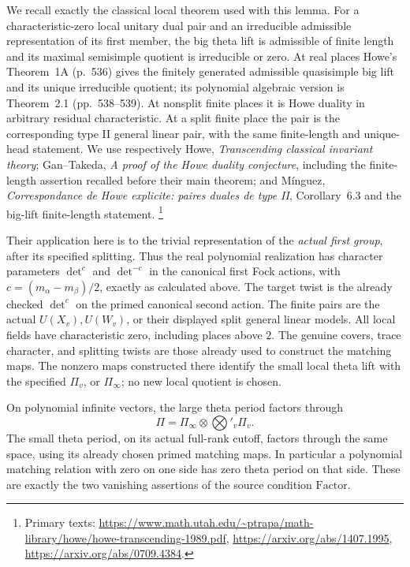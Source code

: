 We recall exactly the classical local theorem used with this lemma.
For a characteristic-zero local unitary dual pair and an irreducible
admissible representation of its first member, the big theta lift is
admissible of finite length and its maximal semisimple quotient is
irreducible or zero. At real places Howe's Theorem~1A (p.~536) gives the finitely
generated admissible quasisimple big lift and its unique irreducible
quotient; its polynomial algebraic version is Theorem~2.1
(pp.~538--539). At nonsplit finite places it is Howe duality in
arbitrary residual characteristic.
At a split finite place the pair is the corresponding type II
general linear pair, with the same finite-length and unique-head
statement. We use respectively Howe,
\emph{Transcending classical invariant theory};
Gan--Takeda, \emph{A proof of the Howe duality conjecture}, including
the finite-length assertion recalled before their main theorem;
and M\'inguez, \emph{Correspondance de Howe explicite: paires duales
de type II}, Corollary~6.3 and the big-lift finite-length statement.
\footnote{Primary texts:
\url{https://www.math.utah.edu/~ptrapa/math-library/howe/howe-transcending-1989.pdf},
\url{https://arxiv.org/abs/1407.1995},
\url{https://arxiv.org/abs/0709.4384}.}

Their application here is to the trivial representation of the
\emph{actual first group}, after its specified splitting.
Thus the real polynomial realization has character parameters
\(\det^c\) and \(\det^{-c}\) in the canonical first Fock actions,
with \(c=(m_\alpha-m_\beta)/2\), exactly as calculated above.
The target twist is the already checked \(\det^c\) on the primed
canonical second action. The finite pairs are the actual
\(U(X_v),U(W_v)\), or their displayed split general linear models.
All local fields have characteristic zero, including places above
\(2\). The genuine covers, trace character, and splitting twists
are those already used to construct the matching maps.
The nonzero maps constructed there identify the small local theta
lift with the specified \(\Pi_v\), or \(\Pi_\infty\); no new
local quotient is chosen.

\begin{srproposition}
\label{prop:sr-theta-actual-period-factor}
On polynomial infinite vectors, the large theta period factors through
\[
       \Pi=\Pi_\infty\otimes
                   \bigotimes\nolimits'_v\Pi_v .
 \tag{D1}\label{eq:sr-theta-common-global-module}
\]
The small theta period, on its actual full-rank cutoff, factors through
the same space, using its already chosen primed matching maps.
In particular a polynomial matching relation with zero on one side
has zero theta period on that side. These are exactly the two
vanishing assertions of the source condition \(\mathrm{Factor}\).
\end{srproposition}

